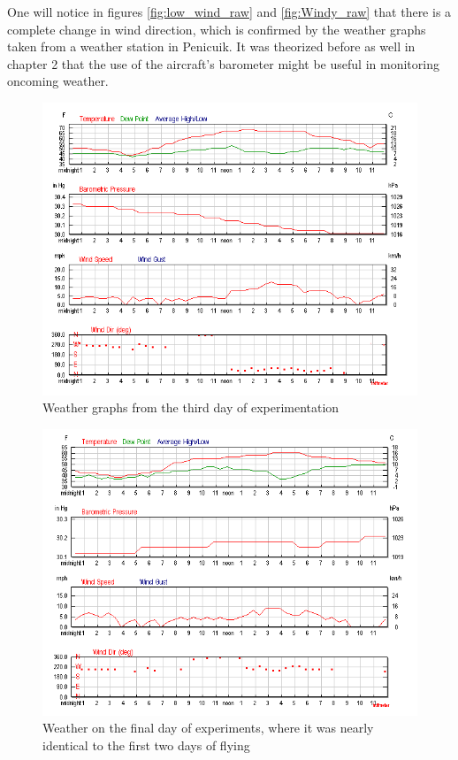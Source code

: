 \documentclass[12pt]{report}
\begin{document}
One will notice in figures \ref{fig:low_wind_raw} and \ref{fig:Windy_raw} that there is a complete change in wind direction, which is confirmed by the weather graphs taken from a weather station in Penicuik. It was theorized before as well in chapter 2 that the use of the aircraft's barometer might be useful in monitoring oncoming weather.
\begin{figure}[!ht]
	\centering
	\includegraphics[scale=0.63]{curious_weather.png}
	\caption{Weather graphs from the third day of experimentation \cite{wUnderground}}
	\label{fig:curious_weather}
\end{figure}
\begin{figure}[!ht]
	\centering
	\includegraphics[scale=0.63]{last.png}
	\caption{Weather on the final day of experiments, where it was nearly identical to the first two days of flying \cite{wUnderground}}
	\label{fig:curious_last_day}
\end{figure}
\end{document}
